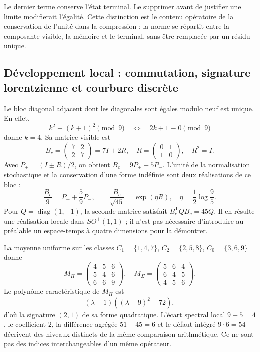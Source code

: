 Le dernier terme conserve l’état terminal. Le supprimer avant de justifier une limite modifierait l’égalité. Cette distinction est le contenu opératoire de la conservation de l’unité dans la compression : la norme se répartit entre la composante visible, la mémoire et le terminal, sans être remplacée par un résidu unique.

\subsection{Développement local : commutation, signature lorentzienne et courbure discrète}
\label{x_reciprocidad:vii:sec:bloque-compresion}
\label{x_reciprocidad:iv:extension-curvatura-mixta}

Le bloc diagonal adjacent dont les diagonales sont égales modulo neuf est unique. En effet,
\[
 k^2\equiv(k+1)^2\pmod9\quad\Longleftrightarrow\quad2k+1\equiv0\pmod9
\]
donne \(k=4\). Sa matrice visible est
\[
 B_c=\begin{pmatrix}7&2\\2&7\end{pmatrix}=7I+2R,
 \quad R=\begin{pmatrix}0&1\\1&0\end{pmatrix},\quad R^2=I.
\]
Avec \(P_\pm=(I\pm R)/2\), on obtient \(B_c=9P_++5P_-\). L’unité de la normalisation stochastique et la conservation d’une forme indéfinie sont deux réalisations de ce bloc :
\[
 \frac{B_c}{9}=P_++\frac59P_-,\qquad
 \frac{B_c}{\sqrt{45}}=\exp(\eta R),\quad\eta=\frac12\log\frac95.
\]
Pour \(Q=\operatorname{diag}(1,-1)\), la seconde matrice satisfait \(B_c^{\mathsf T}QB_c=45Q\). Il en résulte une réalisation locale dans \(SO^+(1,1)\) ; il n’est pas nécessaire d’introduire au préalable un espace-temps à quatre dimensions pour la démontrer.

La moyenne uniforme sur les classes \(C_1=\{1,4,7\}\), \(C_2=\{2,5,8\}\), \(C_0=\{3,6,9\}\) donne
\[
 M_\Pi=\begin{pmatrix}4&5&6\\5&4&6\\6&6&9\end{pmatrix},\quad
 M_\Sigma=\begin{pmatrix}5&6&4\\6&4&5\\4&5&6\end{pmatrix}.
\]
Le polynôme caractéristique de \(M_\Pi\) est
\[
 (\lambda+1)((\lambda-9)^2-72),
\]
d’où la signature \((2,1)\) de sa forme quadratique. L’écart spectral local \(9-5=4\), le coefficient \(2\), la différence agrégée \(51-45=6\) et le défaut intégré \(9\cdot6=54\) décrivent des niveaux distincts de la même comparaison arithmétique. Ce ne sont pas des indices interchangeables d’un même opérateur.

